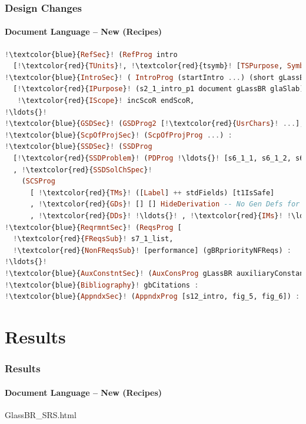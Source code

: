 \documentclass{beamer}
\begin{document}
\begin{frame}[fragile]

\frametitle{Design Changes}
\framesubtitle{Document Language -- New (Recipes)}

\begin{lstlisting}[language=Haskell, frame=single, showstringspaces=false, basicstyle=\scriptsize, escapechar=!]
!\textcolor{blue}{RefSec}! (RefProg intro 
  [!\textcolor{red}{TUnits}!, !\textcolor{red}{tsymb}! [TSPurpose, SymbOrder], !\textcolor{red}{TAandA}!]) :
!\textcolor{blue}{IntroSec}! ( IntroProg (startIntro ...) (short gLassBR)
  [!\textcolor{red}{IPurpose}! (s2_1_intro_p1 document gLassBR glaSlab),
   !\textcolor{red}{IScope}! incScoR endScoR,
!\ldots{}!
!\textcolor{blue}{GSDSec}! (GSDProg2 [!\textcolor{red}{UsrChars}! ...], !\textcolor{red}{SystCons}! [] []]) :
!\textcolor{blue}{ScpOfProjSec}! (ScpOfProjProg ...) :
!\textcolor{blue}{SSDSec}! (SSDProg
  [!\textcolor{red}{SSDProblem}! (PDProg !\ldots{}! [s6_1_1, s6_1_2, s6_1_3])
  , !\textcolor{red}{SSDSolChSpec}!
    (SCSProg
      [ !\textcolor{red}{TMs}! ([Label] ++ stdFields) [t1IsSafe]
      , !\textcolor{red}{GDs}! [] [] HideDerivation -- No Gen Defs for GlassBR
      , !\textcolor{red}{DDs}! !\ldots{}! , !\textcolor{red}{IMs}! !\ldots{}! ])]) :
!\textcolor{blue}{ReqrmntSec}! (ReqsProg [
  !\textcolor{red}{FReqsSub}! s7_1_list, 
  !\textcolor{red}{NonFReqsSub}! [performance] (gBRpriorityNFReqs) :
!\ldots{}!
!\textcolor{blue}{AuxConstntSec}! (AuxConsProg gLassBR auxiliaryConstants) :
!\textcolor{blue}{Bibliography}! gbCitations :
!\textcolor{blue}{AppndxSec}! (AppndxProg [s12_intro, fig_5, fig_6]) : []
\end{lstlisting}

\end{frame}


\section[Results]{Results}


\begin{frame}[fragile]

\frametitle{Results}
\framesubtitle{Document Language -- New (Recipes)}

GlassBR\_SRS.html

\end{frame}
\end{document}
